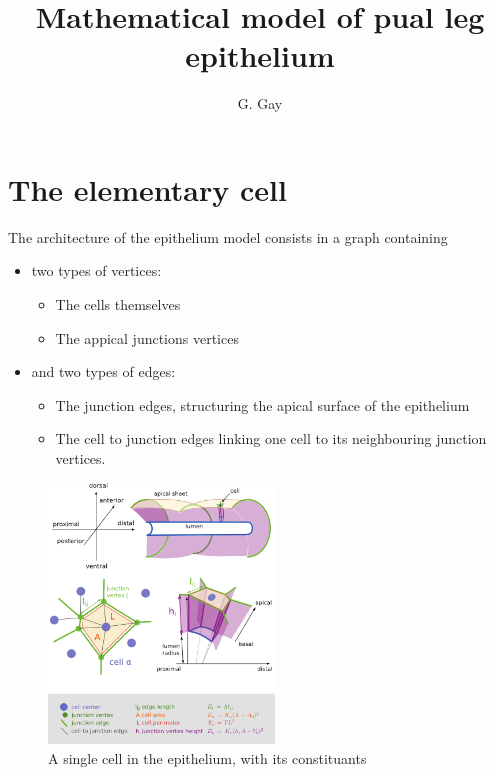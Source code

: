 \documentclass[12pt]{article}
\title{Mathematical model of pual leg epithelium}
\author{G. Gay}
\date{}
\begin{document}
\section{The elementary cell}

The architecture of the epithelium model consists in a graph containing

\begin{itemize}
\item two types of vertices:
  \begin{itemize}
  \item The cells themselves
  \item The appical junctions vertices
  \end{itemize}
\item and two types of edges:
  \begin{itemize}
  \item The junction edges, structuring the apical surface of the
    epithelium
  \item The cell to junction edges linking one cell to its
    neighbouring junction vertices.
  \end{itemize}
\end{itemize}

\begin{figure}[htbp]
  \centering
  \includegraphics[width=6cm]{one_cell}
  \caption{A single cell in the epithelium, with its constituants}
  \label{fig:single_cell}
\end{figure}
\end{document}

